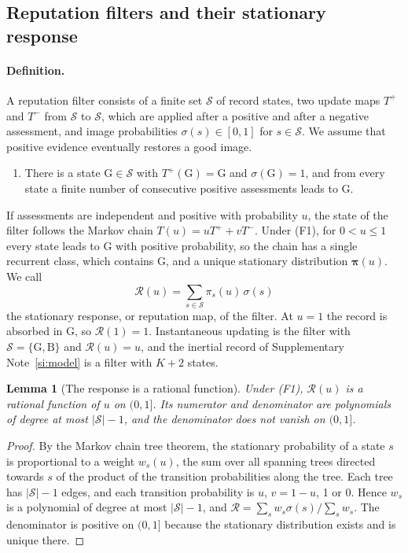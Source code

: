 \documentclass[10pt]{wlscirep}
\newcommand{\Rmap}{\mathscr{R}}            %
\newcommand{\st}[1]{\mathrm{#1}}           %
\theoremstyle{plain}
\newtheorem{lemma}{Lemma}
\theoremstyle{remark}
\begin{document}
\subsection{Reputation filters and their stationary response}

\paragraph{Definition.} A reputation filter consists of a finite set $\mathcal S$ of record states, two update maps $T^+$ and $T^-$ from $\mathcal S$ to $\mathcal S$, which are applied after a positive and after a negative assessment, and image probabilities $\sigma(s)\in[0,1]$ for $s\in\mathcal S$. We assume that positive evidence eventually restores a good image.
\begin{enumerate}
\item[(F1)] There is a state $\st G\in\mathcal S$ with $T^+(\st G)=\st G$ and $\sigma(\st G)=1$, and from every state a finite number of consecutive positive assessments leads to $\st G$.
\end{enumerate}
If assessments are independent and positive with probability $u$, the state of the filter follows the Markov chain $T(u)=uT^++vT^-$. Under (F1), for $0<u\leq1$ every state leads to $\st G$ with positive probability, so the chain has a single recurrent class, which contains $\st G$, and a unique stationary distribution $\bm\pi(u)$. We call
\begin{equation}
\Rmap(u)=\sum_{s\in\mathcal S}\pi_s(u)\,\sigma(s)
\label{eq:s-filter-response}
\end{equation}
the stationary response, or reputation map, of the filter. At $u=1$ the record is absorbed in $\st G$, so $\Rmap(1)=1$. Instantaneous updating is the filter with $\mathcal S=\{\st G,\st B\}$ and $\Rmap(u)=u$, and the inertial record of Supplementary Note~\ref{si:model} is a filter with $K+2$ states.

\begin{lemma}[The response is a rational function]\label{lem:rational}
Under (F1), $\Rmap(u)$ is a rational function of $u$ on $(0,1]$. Its numerator and denominator are polynomials of degree at most $|\mathcal S|-1$, and the denominator does not vanish on $(0,1]$.
\end{lemma}
\begin{proof}
By the Markov chain tree theorem, the stationary probability of a state $s$ is proportional to a weight $w_s(u)$, the sum over all spanning trees directed towards $s$ of the product of the transition probabilities along the tree. Each tree has $|\mathcal S|-1$ edges, and each transition probability is $u$, $v=1-u$, 1 or 0. Hence $w_s$ is a polynomial of degree at most $|\mathcal S|-1$, and $\Rmap=\sum_sw_s\sigma(s)/\sum_sw_s$. The denominator is positive on $(0,1]$ because the stationary distribution exists and is unique there.
\end{proof}
\end{document}
